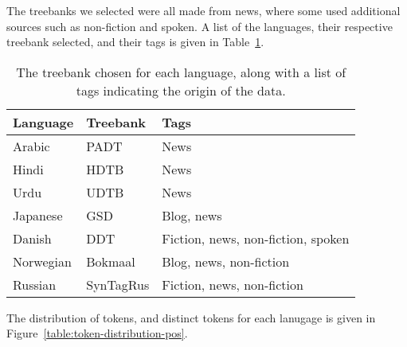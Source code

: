 The treebanks we selected were all made from news, where some used additional
sources such as non-fiction and spoken. A list of the languages, their
respective treebank selected, and their tags is given in
Table~\ref{table:lang_treebank}.

\begin{table}[!ht]
  \centering
  \begin{tabular}{lll}
    \bfseries Language & \bfseries Treebank & \bfseries Tags \\
    \midrule
    Arabic & PADT & News \\
    Hindi &    HDTB & News \\
    Urdu &     UDTB & News \\
    Japanese & GSD & Blog, news \\
    Danish &   DDT & Fiction, news, non-fiction, spoken \\
    Norwegian & Bokmaal & Blog, news, non-fiction \\
    Russian &  SynTagRus & Fiction, news, non-fiction \\
  \end{tabular}
  \caption{The treebank chosen for each language, along with a list of tags
  indicating the origin of the data.}\label{table:lang_treebank}
\end{table}

The distribution of tokens, and distinct tokens for each lanugage is given in
Figure~\ref{table:token-distribution-pos}.

